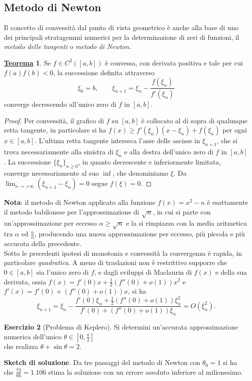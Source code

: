 \documentclass[a4paper,twoside]{article}
\theoremstyle{definition}
\newtheorem{theorem}{\color{Red}\underline{\textrm Teorema}}
\newtheorem{ex}[theorem]{Esercizio}
\numberwithin{theorem}{section}
\begin{document}
\subsection{Metodo di Newton}
Il concetto di convessità dal punto di vista geometrico è anche alla base di uno dei principali stratagemmi numerici per la determinazione di zeri di funzioni, il \emph{metodo delle tangenti} o \emph{metodo di Newton}.

\begin{theorem} Se $f\in C^2([a,b])$ è convessa, con derivata positiva e tale per cui $f(a)f(b)<0$, la successione definita attraverso 
$$ \xi_0 = b,\qquad \xi_{n+1} = \xi_n - \frac{f(\xi_n)}{f'(\xi_n)} $$
converge decrescendo all'unico zero di $f$ in $[a,b]$. 
 
\end{theorem}
\begin{proof}
Per convessità, il grafico di $f$ su $[a,b]$ è collocato al di sopra di qualunque retta tangente, in particolare si ha $f(x)\geq f'(\xi_n)(x-\xi_n)+f(\xi_n)$ per ogni $x\in[a,b]$. L'ultima retta tangente interseca l'asse delle ascisse in $\xi_{n+1}$, che si trova necessariamente alla sinistra di $\xi_n$ e alla destra dell'unico zero di $f$ in $[a,b]$. La successione $\{\xi_n\}_{n\geq 0}$, in quanto decrescente e inferiormente limitata, converge necessariamente al suo $\inf$, che denominiamo $\xi$. Da $\lim_{n\to +\infty}(\xi_{n+1}-\xi_n)=0$ segue $f(\xi)=0$.
\end{proof}

\textbf{Nota}: il metodo di Newton applicato alla funzione $f(x)=x^2-n$ è esattamente il metodo babilonese per l'approssimazione di $\sqrt{n}$, in cui si parte con un'approssimazione per eccesso $\alpha \geq \sqrt{n}$ e la si rimpiazza con la media aritmetica tra $\alpha$ ed $\frac{n}{\alpha}$, producendo una nuova approssimazione per eccesso, più piccola e più accurata della precedente.\\

Sotto le precedenti ipotesi di monotonia e convessità la convergenza è rapida, in particolare \emph{quadratica}. A meno di traslazioni non è restrittivo supporre che $0\in[a,b]$ sia l'unico zero di $f$, e dagli sviluppi di Maclaurin di $f(x)$ e della sua derivata, ossia $f(x)=f'(0)x + \frac{1}{2}(f''(0)+o(1))x^2$ e $f'(x)=f'(0)+(f''(0)+o(1))x$, si ha 
$$ \xi_{n+1} = \xi_n - \frac{f'(0)\xi_n + \frac{1}{2}(f''(0)+o(1))\xi_n^2}{f'(0)+(f''(0)+o(1))\xi_n} = O(\xi_n^2). $$

\begin{ex}[Problema di Keplero] Si determini un'accurata approssimazione numerica dell'unico $\theta\in\left[0,\frac{\pi}{2}\right]$\\ che realizza $\theta+\sin\theta = 2$. 
\end{ex}
\textbf{Sketch di soluzione}. Da tre passaggi del metodo di Newton con $\theta_0=1$ si ha che $\frac{73}{66}=1.1\overline{06}$ stima la soluzione con un errore assoluto inferiore al milionesimo.
\end{document}
